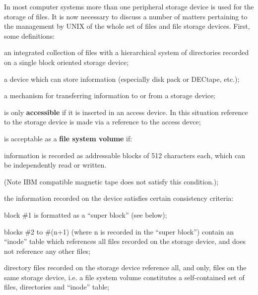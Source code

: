 %
%

In most computer systems more than  one
peripheral  storage  device is used for
the storage of files. It is now  necessary  to  discuss  a  number of matters
pertaining to the management by UNIX of
the whole set of files and file storage
devices. First, some definitions:

\bd
\item[file system:] an integrated collection  of files with a hierarchical
system of directories recorded  on
a  single  block  oriented storage
device;

\item[storage device:] a device which can
store information (especially disk
pack or DECtape, etc.);

\item[access  device:]  a  mechanism  for
transferring   information  to  or
from a storage device;

\item[a  storage   device]    is    only
{\bf accessible} if it is inserted in an
access device.  In this situation
reference to the storage device is
made via a reference to the access
devce;

\item[a storage device] is acceptable  as
a {\bf file system volume} if:

\bd
\item[(a)]  information   is   recorded   as
     addressable  blocks of 512 characters  each,   which   can   be
     independently read or written.

(Note  IBM  compatible  magnetic
tape  does not satisfy this condition.);

\item[(b)] the information recorded  on  the
     device  satisfies  certain  consistency criteria:

block \#1 is formatted as a ``super block'' (see below);

blocks \#2 to \#(n+1)  (where n  is
recorded  in  the ``super block'')
contain an ``inode''  table  which
references all files recorded on
the storage device, and does not
reference any other files;

directory files recorded on  the
storage  device  reference  all,
and  only,  files  on  the  same
storage device, i.e. a file system volume
constitutes  a  self-contained  set  of files,
directories and ``inode'' table;
\ed

